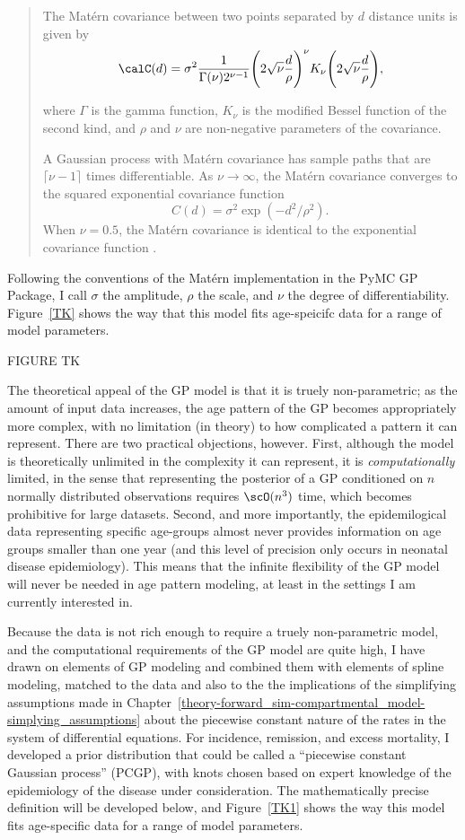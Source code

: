 \begin{quote}
The Mat\'{e}rn covariance between two points separated by $d$ distance
units is given by
\[
\calC(d) =
\sigma^2\frac{1}{\Gamma(\nu)2^{\nu-1}}\Bigg(2\sqrt{\nu}\frac{d}{\rho}\Bigg)^\nu
K_\nu\Bigg(2\sqrt{\nu}\frac{d}{\rho}\Bigg),
\]

where $\Gamma$ is the gamma function, $K_\nu$ is the modified Bessel
function of the second kind, and $\rho$ and $\nu$ are non-negative
parameters of the covariance.

A Gaussian process with Mat\'{e}rn covariance has sample paths that are
$\lceil \nu-1 \rceil$ times differentiable. As $\nu\rightarrow\infty$,
the Mat\'{e}rn covariance converges to the squared exponential covariance
function
\[
C(d) = \sigma^2\exp(-d^2/\rho^2). \,
\]
When $\nu = 0.5$, the Mat\'{e}rn covariance is identical to the
exponential covariance function \cite{WP:Matern}.
\end{quote}

Following the conventions of the Mat\'{e}rn implementation in the PyMC GP
Package, I call $\sigma$ the amplitude, $\rho$ the scale, and $\nu$
the degree of differentiability.  Figure~\ref{TK} shows the way that
this model fits age-speicifc data for a range of model parameters.

FIGURE TK

The theoretical appeal of the GP model is that it is truely
non-parametric;  as the amount of input data increases, the age
pattern of the GP becomes appropriately more complex, with no
limitation (in theory) to how complicated a pattern it can represent.
There are two practical objections, however.  First, although the
model is theoretically unlimited in the complexity it can represent,
it is \emph{computationally} limited, in the sense that representing
the posterior of a GP conditioned on $n$ normally
distributed observations requires $\scO(n^3)$ time, which becomes
prohibitive for large datasets.  Second, and more importantly, the
epidemilogical data representing specific age-groups almost never
provides information on age groups smaller than one year (and this level
of precision only occurs in neonatal disease epidemiology).  This
means that the infinite flexibility of the GP model will never be
needed in age pattern modeling, at least in the settings I am
currently interested in.

Because the data is not rich enough to require a truely non-parametric
model, and the computational requirements of the GP model are quite
high, I have drawn on elements of GP modeling and combined them with
elements of
spline modeling, matched to the data and also to the the implications
of the simplifying assumptions made in
Chapter~\ref{theory-forward_sim-compartmental_model-simplying_assumptions}
about the piecewise constant nature of the rates in the system of
differential equations.  For incidence, remission, and excess
mortality, I developed a prior distribution that could be called a
``piecewise constant Gaussian process'' (PCGP), with knots chosen
based on expert knowledge of the epidemiology of the disease under
consideration.  The mathematically precise definition will be
developed below, and Figure~\ref{TK1} shows the way this model fits
age-specific data for a range of model parameters.

